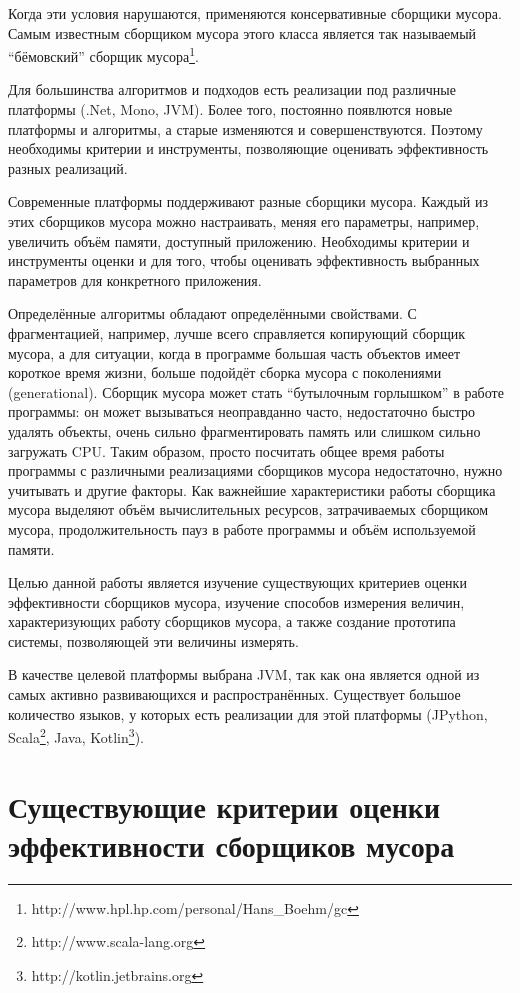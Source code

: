 Когда эти условия нарушаются, применяются консервативные сборщики мусора. Самым известным
сборщиком мусора этого класса является так называемый ``бёмовский''
сборщик мусора\footnote{http://www.hpl.hp.com/personal/Hans\_Boehm/gc}. 

Для большинства алгоритмов и подходов есть реализации под различные платформы (.Net,
Mono, JVM). Более того, постоянно появлются новые платформы и алгоритмы, а старые 
изменяются и совершенствуются. Поэтому необходимы критерии
и инструменты, позволяющие оценивать эффективность разных реализаций.

Современные платформы поддерживают разные сборщики мусора. Каждый из этих сборщиков мусора можно 
настраивать, меняя его параметры, например, увеличить объём памяти, доступный приложению. 
Необходимы критерии и инструменты оценки и для того, чтобы оценивать
эффективность выбранных параметров для конкретного приложения. 

Определённые алгоритмы обладают определёнными свойствами. С фрагментацией, например, лучше всего 
справляется копирующий сборщик мусора, а для ситуации, когда в программе большая
часть объектов имеет короткое время жизни, больше подойдёт сборка мусора с поколениями (generational).
Сборщик мусора может стать ``бутылочным горлышком'' в работе программы: он может вызываться
неоправданно часто, недостаточно быстро удалять объекты, очень сильно фрагментировать 
память или слишком сильно загружать CPU. Таким образом, просто посчитать общее время 
работы программы с различными реализациями сборщиков мусора недостаточно, нужно 
учитывать и другие факторы. Как важнейшие характеристики работы сборщика мусора выделяют
объём вычислительных ресурсов, затрачиваемых сборщиком мусора, продолжительность
пауз в работе программы и объём используемой памяти.

Целью данной работы является изучение существующих критериев оценки эффективности сборщиков 
мусора, изучение способов измерения величин, характеризующих работу сборщиков мусора,
а также создание прототипа системы, позволяющей эти величины измерять. 

В качестве целевой платформы выбрана JVM, так как она является одной из самых активно 
развивающихся и распространённых. Существует большое количество языков, у которых 
есть реализации для этой платформы (JPython, Scala\footnote{http://www.scala-lang.org},
Java, Kotlin\footnote{http://kotlin.jetbrains.org}).

\section{Существующие критерии оценки эффективности сборщиков мусора}


